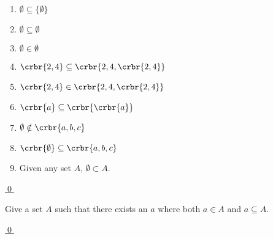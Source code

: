 \documentclass[11pt]{article}
\begin{document}
{\begin{uexercise}
\begin{enumerate}
\item\label{e2} $\emptyset \subseteq \{\emptyset\}$

\item\label{e3}  $\emptyset \subseteq \emptyset$

\item\label{e4} $\emptyset \in \emptyset$

\item\label{e5} $\crbr{2,4} \subseteq \crbr{2,4,\crbr{2,4}}$

\item\label{e6} $\crbr{2,4} \in \crbr{2,4,\crbr{2,4}}$

\item\label{f1}
$\crbr{a} \subseteq \crbr{\crbr{a}}$
\item \label{f2}
$\emptyset \notin \crbr{a,b,c}$
\item \label{f3}
$\crbr{\emptyset} \subseteq \crbr{a,b,c}$
\item\label{f5}
Given any set $A$, $\emptyset \subset A$.
\end{enumerate}
 
\hyperlink{truefalse1-sol}{\qed}
\end{uexercise}

\begin{uexercise}\label{ex-aina}

Give a set $A$ such that there exists an $a$ where both $a \in A$ and
$a\subseteq A$.

\hyperlink{ex-aina-sol}{\qed}
\end{uexercise}

\hrulefill
}
\end{document}
